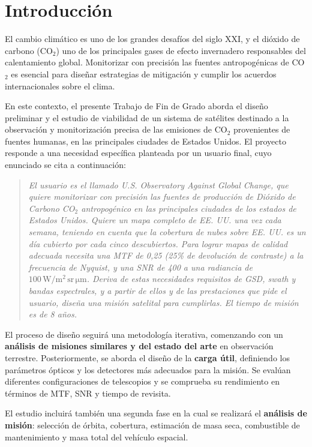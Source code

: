 \chapter{Introducción}

El cambio climático es uno de los grandes desafíos del siglo XXI, y el dióxido de carbono (CO$_2$) uno de los principales gases de efecto invernadero responsables del calentamiento global. Monitorizar con precisión las fuentes antropogénicas de CO$_2$ es esencial para diseñar estrategias de mitigación y cumplir los acuerdos internacionales sobre el clima.


En este contexto, el presente Trabajo de Fin de Grado aborda el diseño preliminar y el estudio de viabilidad de un sistema de satélites destinado a la observación y monitorización precisa de las emisiones de CO$_2$  provenientes de fuentes humanas, en las principales ciudades de Estados Unidos. El proyecto responde a una necesidad específica planteada por un usuario final, cuyo enunciado se cita a continuación:


\begin{quote}
\textit{El usuario es el llamado U.S. Observatory Against Global Change, que quiere monitorizar con precisión las fuentes de producción de Dióxido de Carbono CO$_2$ antropogénico en las principales ciudades de los estados de Estados Unidos. Quiere un mapa completo de EE. UU. una vez cada semana, teniendo en cuenta que la cobertura de nubes sobre EE. UU. es un día cubierto por cada cinco descubiertos. Para lograr mapas de calidad adecuada necesita una MTF de 0,25 (25\% de devolución de contraste) a la frecuencia de Nyquist, y una SNR de 400 a una radiancia de $100\,\mathrm{W/m^2\,sr\,\mu m}$. Deriva de estas necesidades requisitos de GSD, swath y bandas espectrales, y a partir de ellos y de las prestaciones que pide el usuario, diseña una misión satelital para cumplirlas. El tiempo de misión es de 8 años.}
\end{quote}

El proceso de diseño seguirá una metodología iterativa, comenzando con un \textbf{análisis de misiones similares y del estado del arte} en observación terrestre. Posteriormente, se aborda el diseño de la \textbf{carga útil}, definiendo los parámetros ópticos y los detectores más adecuados para la misión. Se evalúan diferentes configuraciones de telescopios y se comprueba su rendimiento en términos de MTF, SNR y tiempo de revisita.

El estudio incluirá también una segunda fase en la cual se realizará el \textbf{análisis de misión}: selección de órbita, cobertura, estimación de masa seca, combustible de mantenimiento y masa total del vehículo espacial.

